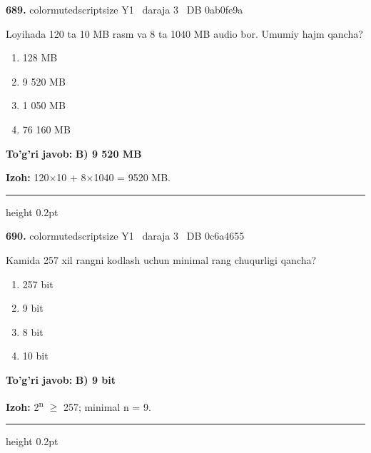 \documentclass[10pt,a4paper,oneside]{article}
\begin{document}
\noindent\textbf{\color{ink}689.}  {color{muted}scriptsize Y1 \textbullet\ daraja 3 \textbullet\ DB 0ab0fe9a}
\par
Loyihada 120 ta 10 MB rasm va 8 ta 1040 MB audio bor. Umumiy hajm qancha?
\begin{enumerate}[label=\Alph*),leftmargin=9mm]
\item 128 MB
\item 9 520 MB
\item 1 050 MB
\item 76 160 MB
\end{enumerate}
\begin{tcolorbox}[enhanced,breakable,colback=teal!4,colframe=teal!50!black,boxrule=0.5pt,arc=1.1mm,left=3mm,right=3mm,top=1.7mm,bottom=1.7mm,before skip=2mm,after skip=2mm]
\textbf{\color{teal}To'g'ri javob:} \textbf{B) 9 520 MB}
\par\smallskip
\textbf{Izoh:} 120\ensuremath{\times}10 + 8\ensuremath{\times}1040 = 9520 MB.
\end{tcolorbox}
\vspace{2mm}\hrule height 0.2pt \vspace{3mm}

\noindent\textbf{\color{ink}690.}  {color{muted}scriptsize Y1 \textbullet\ daraja 3 \textbullet\ DB 0c6a4655}
\par
Kamida 257 xil rangni kodlash uchun minimal rang chuqurligi qancha?
\begin{enumerate}[label=\Alph*),leftmargin=9mm]
\item 257 bit
\item 9 bit
\item 8 bit
\item 10 bit
\end{enumerate}
\begin{tcolorbox}[enhanced,breakable,colback=teal!4,colframe=teal!50!black,boxrule=0.5pt,arc=1.1mm,left=3mm,right=3mm,top=1.7mm,bottom=1.7mm,before skip=2mm,after skip=2mm]
\textbf{\color{teal}To'g'ri javob:} \textbf{B) 9 bit}
\par\smallskip
\textbf{Izoh:} 2\textsuperscript{n} \ensuremath{\geq} 257; minimal n = 9.
\end{tcolorbox}
\vspace{2mm}\hrule height 0.2pt \vspace{3mm}
\end{document}
